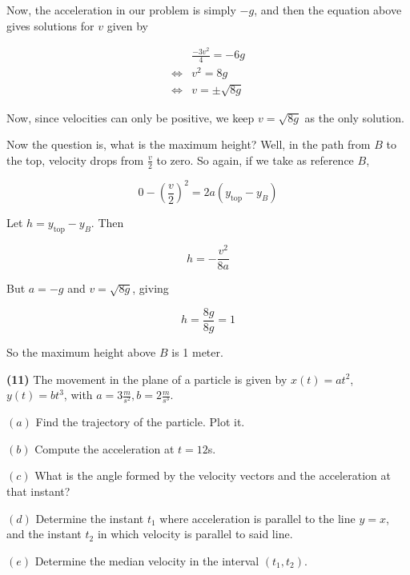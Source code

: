 \documentclass[12pt]{article}
\theoremstyle{definition}
\begin{document}
Now, the acceleration in our problem is simply $-g$, and then the equation above
gives solutions for $v$ given by

\begin{align*}
    &\frac{-3v^2}{4} = -6g \\ 
    \iff &v^2 = 8g \\ 
    \iff&v = \pm\sqrt{8g} 
\end{align*}

Now, since velocities can only be positive, we keep $v = \sqrt{8g} $ as the only
solution.

Now the question is, what is the maximum height? Well, in the path from $B$ to
the top, velocity drops from $\frac{v}{2}$ to zero. So again, if we take as
reference $B$, 

\begin{equation*}
    0 - \left( \frac{v}{2} \right) ^2 = 2a(y_{\text{top}} - y_B)
\end{equation*}

Let $h = y_{\text{top}} - y_B$. Then 

\begin{equation*}
    h = -\frac{v^2}{8a}
\end{equation*}

But $a = -g$ and $v = \sqrt{8g} $, giving 

\begin{equation*}
    h = \frac{8g}{8g} = 1
\end{equation*}

So the maximum height above $B$ is 1 meter.

\pagebreak 

\begin{shaded}
    \textbf{(11)} The movement in the plane of a particle is given by $x(t) =
    at^2$, $y(t) = b t ^3$, with $a = 3\frac{m}{s^2}, b = 2\frac{m}{s^3}$.

    $(a)$ Find the trajectory of the particle. Plot it. 

    $(b)$ Compute the acceleration at $t = 12$s. 

    $(c)$ What is the angle formed by the velocity vectors and the acceleration
    at that instant? 

    $(d)$ Determine the instant $t_1$ where acceleration is parallel to the line
    $y = x$, and the instant $t_2$ in which velocity is parallel to said line. 

    $(e)$ Determine the median velocity in the interval $(t_1, t_2)$.
\end{shaded}
\end{document}
